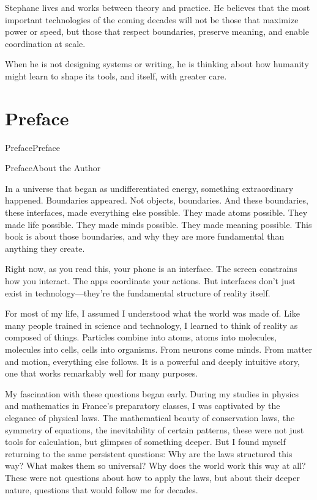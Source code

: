 \documentclass[
  openright]{book}
\makeatletter
\def\temp{#2}%
\def\tempb{About the Author}%
\let\oldaddcontentsline\addcontentsline
\newif\ifprefaceadded
\newif\ifaboutauthoradded
\renewcommand{\addcontentsline}[3]{%
  \def\temp{#3}%
  \def\tempa{Preface}%
  \def\tempb{About the Author}%
  \ifx\temp\tempa
    \ifprefaceadded\else
      \oldaddcontentsline{toc}{part}{#3}%
      \prefaceaddedtrue
    \fi
  \else
    \ifx\temp\tempb
      \ifaboutauthoradded\else
        \oldaddcontentsline{toc}{part}{#3}%
        \aboutauthoraddedtrue
      \fi
    \else
      \oldaddcontentsline{#1}{#2}{#3}%
    \fi
  \fi
}
\makeatother
\begin{document}
Stephane lives and works between theory and practice. He believes that
the most important technologies of the coming decades will not be those
that maximize power or speed, but those that respect boundaries,
preserve meaning, and enable coordination at scale.

When he is not designing systems or writing, he is thinking about how
humanity might learn to shape its tools, and itself, with greater care.

\chapter*{Preface}\label{preface}


In a universe that began as undifferentiated energy, something
extraordinary happened. Boundaries appeared. Not objects, boundaries.
And these boundaries, these interfaces, made everything else possible.
They made atoms possible. They made life possible. They made minds
possible. They made meaning possible. This book is about those
boundaries, and why they are more fundamental than anything they create.

Right now, as you read this, your phone is an interface. The screen
constrains how you interact. The apps coordinate your actions. But
interfaces don't just exist in technology---they're the fundamental
structure of reality itself.

For most of my life, I assumed I understood what the world was made of.
Like many people trained in science and technology, I learned to think
of reality as composed of things. Particles combine into atoms, atoms
into molecules, molecules into cells, cells into organisms. From neurons
come minds. From matter and motion, everything else follows. It is a
powerful and deeply intuitive story, one that works remarkably well for
many purposes.

My fascination with these questions began early. During my studies in
physics and mathematics in France's preparatory classes, I was
captivated by the elegance of physical laws. The mathematical beauty of
conservation laws, the symmetry of equations, the inevitability of
certain patterns, these were not just tools for calculation, but
glimpses of something deeper. But I found myself returning to the same
persistent questions: Why are the laws structured this way? What makes
them so universal? Why does the world work this way at all? These were
not questions about how to apply the laws, but about their deeper
nature, questions that would follow me for decades.
\end{document}
